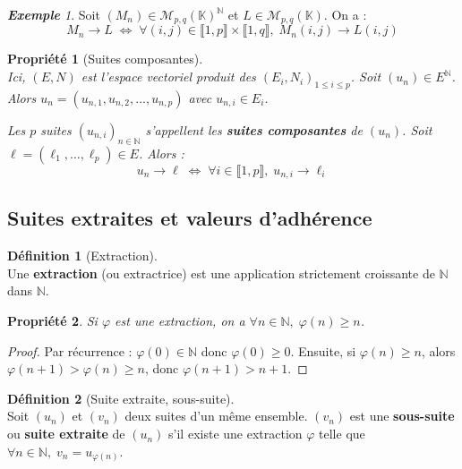 \documentclass[12pt]{book}
\let\ensembleNombre\mathbb
\newcommand*\N{\ensuremath{\ensembleNombre{N}}}
\newcommand*\K{\ensuremath{\ensembleNombre{K}}}
\newtheorem*{prop}{Propriété}
\theoremstyle{definition}
\newtheorem*{defi}{Définition}
\theoremstyle{remark}
\newtheorem*{ex}{\textbf{Exemple}}
\newenvironment{fdef}
  {\begin{mdframed}[roundcorner=10pt, linewidth=1pt]\begin{defi}}
  {\end{defi}\end{mdframed}}
\begin{document}
	\begin{ex}
	Soit $(M_n) \in \mathcal M_{p,q}(\K)^\N$ et $L \in \mathcal M_{p,q}(\K)$. On a :
	\[ M_n \longrightarrow L \;\Longleftrightarrow\; \forall (i,j) \in \llbracket 1, p \rrbracket \times \llbracket 1, q \rrbracket,\; M_n(i,j) \longrightarrow L(i,j) \]
	\end{ex}
	
	\begin{prop}[Suites composantes]\mbox{~}\\
	Ici, $(E, N)$ est l'espace vectoriel produit des $(E_i, N_i)_{1 \leq i \leq p}$. Soit $(u_n) \in E^\N$. Alors $u_n = (u_{n,1}, u_{n,2}, \ldots, u_{n,p})$ avec $u_{n,i} \in E_i$.
	
	Les $p$ suites $(u_{n,i})_{n\in \N}$ s'appellent les \textbf{suites composantes} de $(u_n)$. Soit $\ell = (\ell_1, \ldots, \ell_p) \in E$. Alors :
	\[ \boxed{u_n \longrightarrow \ell \;\Longleftrightarrow\; \forall i\in \llbracket 1, p \rrbracket, \; u_{n,i} \longrightarrow \ell_i} \]
	\end{prop} \newpage
	
	\subsection{Suites extraites et valeurs d'adhérence}
	\begin{fdef}[Extraction]\mbox{~}\\
	Une \textbf{extraction} (ou extractrice) est une application strictement croissante de $\N$ dans $\N$.
	\end{fdef}
	
	\begin{prop}
	Si $\varphi$ est une extraction, on a $\forall n \in \N,\; \varphi(n) \geq n$.
	\end{prop}
	\begin{proof}
	Par récurrence : $\varphi(0) \in \N$ donc $\varphi(0) \geq 0$. Ensuite, si $\varphi(n) \geq n$, alors $\varphi(n+1) > \varphi(n) \geq n$, donc $\varphi(n+1) > n+1$.
	\end{proof}
	
	\begin{fdef}[Suite extraite, sous-suite]\mbox{~}\\
	Soit $(u_n)$ et $(v_n)$ deux suites d'un même ensemble. $(v_n)$ est une \textbf{sous-suite} ou \textbf{suite extraite} de $(u_n)$ s'il existe une extraction $\varphi$ telle que $\forall n \in \N,\; v_n = u_{\varphi(n)}$.
	\end{fdef}
	
\end{document}
